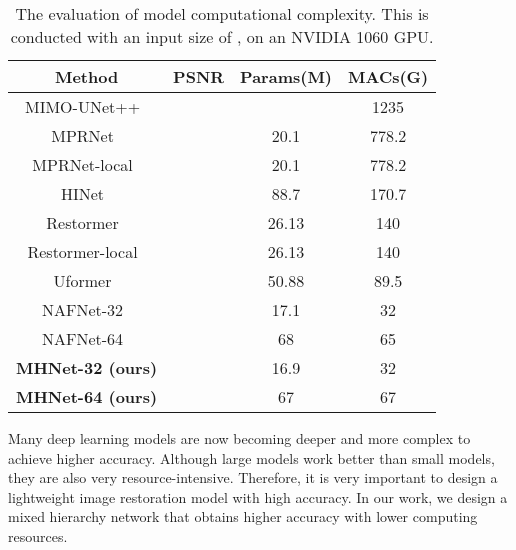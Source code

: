 \documentclass[lettersize,journal]{IEEEtran}
\begin{document}
\begin{table}
\centering
\caption{The evaluation of model computational complexity. This is conducted with an input size of , on an NVIDIA 1060 GPU. \label{tb:04}}

\begin{tabular}{ccccc}
\hline
\multicolumn{2}{c}{Method} & \multicolumn{1}{c}{PSNR} & \multicolumn{1}{c}{Params(M)} & \multicolumn{1}{c}{MACs(G)} 
\\
\hline\hline
\multicolumn{2}{c}{MIMO-UNet++~\cite{2021Rethinking}}  & \multicolumn{1}{c}{} & \multicolumn{1}{c}{}  & \multicolumn{1}{c}{1235} 
\\
\multicolumn{2}{c}{MPRNet~\cite{Zamir2021MPRNet}}  & \multicolumn{1}{c}{} & \multicolumn{1}{c}{20.1}  & \multicolumn{1}{c}{778.2}  
\\
\multicolumn{2}{c}{MPRNet-local~\cite{Zamir2021MPRNet}}  & \multicolumn{1}{c}{} & \multicolumn{1}{c}{20.1}  & \multicolumn{1}{c}{778.2}  
\\
\multicolumn{2}{c}{HINet~\cite{Chen_2021_CVPR}}  & \multicolumn{1}{c}{} & \multicolumn{1}{c}{88.7}  & \multicolumn{1}{c}{170.7} 
\\
\multicolumn{2}{c}{Restormer~\cite{Zamir2021Restormer}}  & \multicolumn{1}{c}{} & \multicolumn{1}{c}{26.13}  & \multicolumn{1}{c}{140} 
\\
\multicolumn{2}{c}{Restormer-local~\cite{Zamir2021Restormer}}  & \multicolumn{1}{c}{} & \multicolumn{1}{c}{26.13}  & \multicolumn{1}{c}{140} 
\\
\multicolumn{2}{c}{Uformer~\cite{Wang_2022_CVPR}}  & \multicolumn{1}{c}{} & \multicolumn{1}{c}{50.88}  & \multicolumn{1}{c}{89.5} 
\\
\hline
\multicolumn{2}{c}{NAFNet-32~\cite{chen2022simple}}  & \multicolumn{1}{c}{} & \multicolumn{1}{c}{17.1}  & \multicolumn{1}{c}{32}
\\
\multicolumn{2}{c}{NAFNet-64~\cite{chen2022simple}}  & \multicolumn{1}{c}{} & \multicolumn{1}{c}{68}  & \multicolumn{1}{c}{65}
\\
\hline
\multicolumn{2}{c}{\textbf{MHNet-32 (ours)}}  & \multicolumn{1}{c}{} & \multicolumn{1}{c}{16.9}  & \multicolumn{1}{c}{32}
\\
\multicolumn{2}{c}{\textbf{MHNet-64 (ours)}}  & \multicolumn{1}{c}{} & \multicolumn{1}{c}{67}  & \multicolumn{1}{c}{67}
\\
\hline
\end{tabular}
\end{table}
Many deep learning models are now becoming deeper and more complex to achieve higher accuracy. Although large models work better than small models, they are also very resource-intensive. Therefore, it is very important to design a lightweight image restoration model with high accuracy. In our work, we design a mixed hierarchy network that obtains higher accuracy with lower computing resources. 
\end{document}
